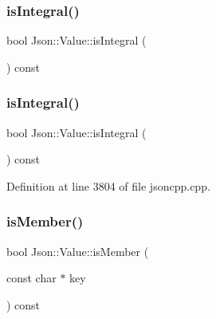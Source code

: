\hypertarget{class_json_1_1_value_ab6798954f6e80281cf22708ef45198a7}{}\label{class_json_1_1_value_ab6798954f6e80281cf22708ef45198a7} 
\subsubsection{\texorpdfstring{is\+Integral()}{isIntegral()}\hspace{0.1cm}{\footnotesize\ttfamily [1/2]}}
{\footnotesize\ttfamily bool Json\+::\+Value\+::is\+Integral (\begin{DoxyParamCaption}{ }\end{DoxyParamCaption}) const}

\hypertarget{class_json_1_1_value_ab6798954f6e80281cf22708ef45198a7}{}\label{class_json_1_1_value_ab6798954f6e80281cf22708ef45198a7} 
\subsubsection{\texorpdfstring{is\+Integral()}{isIntegral()}\hspace{0.1cm}{\footnotesize\ttfamily [2/2]}}
{\footnotesize\ttfamily bool Json\+::\+Value\+::is\+Integral (\begin{DoxyParamCaption}{ }\end{DoxyParamCaption}) const}



Definition at line 3804 of file jsoncpp.\+cpp.

\hypertarget{class_json_1_1_value_ad6d4df2227321bab05e86667609a7fad}{}\label{class_json_1_1_value_ad6d4df2227321bab05e86667609a7fad} 
\subsubsection{\texorpdfstring{is\+Member()}{isMember()}\hspace{0.1cm}{\footnotesize\ttfamily [1/6]}}
{\footnotesize\ttfamily bool Json\+::\+Value\+::is\+Member (\begin{DoxyParamCaption}\item[{const char $\ast$}]{key }\end{DoxyParamCaption}) const}

